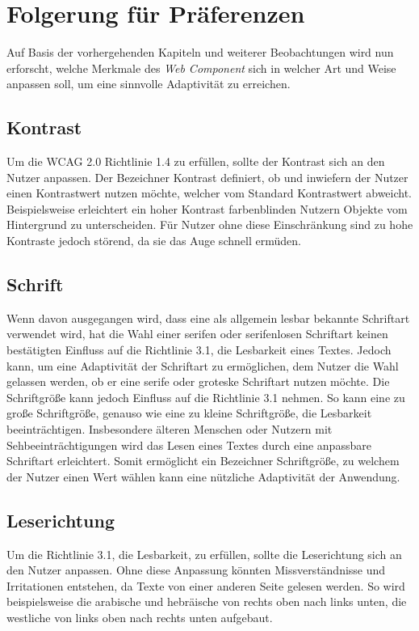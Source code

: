 \documentclass[12pt, paper=a4, bibtotoc, toc=listof, headsepline=true]{scrreprt}
\begin{document}
\section{Folgerung für Präferenzen}
\label{sec:folFuePra}
Auf Basis der vorhergehenden Kapiteln und weiterer Beobachtungen wird nun erforscht, welche Merkmale des \emph{Web Component} sich in welcher Art und Weise anpassen soll, um eine sinnvolle Adaptivität zu erreichen.
\subsection{Kontrast}
Um die \ac{WCAG 2.0} Richtlinie 1.4 zu erfüllen, sollte der Kontrast sich an den Nutzer anpassen. Der Bezeichner Kontrast definiert, ob und inwiefern der Nutzer einen Kontrastwert nutzen möchte, welcher vom Standard Kontrastwert abweicht. Beispielsweise erleichtert ein hoher Kontrast farbenblinden Nutzern Objekte vom Hintergrund zu unterscheiden. Für Nutzer ohne diese Einschränkung sind zu hohe Kontraste jedoch störend, da sie das Auge schnell ermüden\cite[S.234]{balzert2009webdesign}.
\subsection{Schrift}
Wenn davon ausgegangen wird, dass eine als allgemein lesbar bekannte Schriftart verwendet wird, hat die Wahl einer serifen oder serifenlosen Schriftart keinen bestätigten Einfluss auf die Richtlinie 3.1, die Lesbarkeit eines Textes\cite[S.157-161]{barrierefreiheit}. Jedoch kann, um eine Adaptivität der Schriftart zu ermöglichen, dem Nutzer die Wahl gelassen werden, ob er eine serife oder groteske Schriftart nutzen möchte.
Die Schriftgröße kann jedoch Einfluss auf die Richtlinie 3.1 nehmen. So kann eine zu große Schriftgröße, genauso wie eine zu kleine Schriftgröße, die Lesbarkeit beeinträchtigen. Insbesondere älteren Menschen oder Nutzern mit Sehbeeinträchtigungen wird das Lesen eines Textes durch eine anpassbare Schriftart erleichtert\cite[S.152]{barrierefreiheit}. Somit ermöglicht ein Bezeichner Schriftgröße, zu welchem der Nutzer einen Wert wählen kann eine nützliche Adaptivität der Anwendung. 
\subsection{Leserichtung}
\label{ref:lesRic}
Um die Richtlinie 3.1, die Lesbarkeit, zu erfüllen, sollte die Leserichtung sich an den Nutzer anpassen. Ohne diese Anpassung könnten Missverständnisse und Irritationen entstehen, da Texte von einer anderen Seite gelesen werden. So wird beispielsweise die arabische und hebräische von rechts oben nach links unten, die westliche von links oben nach rechts unten aufgebaut\cite[S.148]{emrich2013interkulturelles}.
\end{document}
